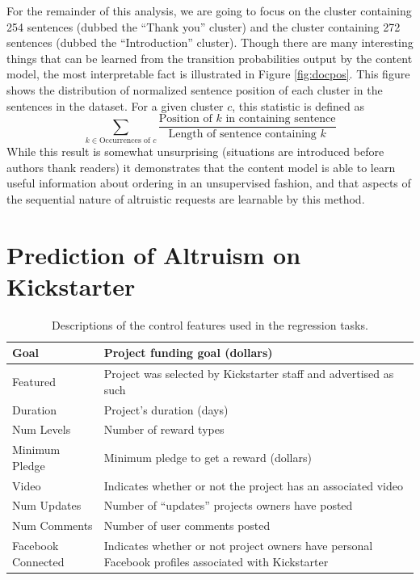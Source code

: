 \documentclass[letterpaper]{article}
\begin{document}
For the remainder of this analysis, we are going to focus on the cluster containing 254 sentences (dubbed the ``Thank you'' cluster) and the cluster containing 272 sentences (dubbed the ``Introduction'' cluster). Though there are many interesting things that can be learned from the transition probabilities output by the content model, the most interpretable fact is illustrated in Figure \ref{fig:docpos}. This figure shows the distribution of normalized sentence position of each cluster in the sentences in the dataset. For a given cluster $c$, this statistic is defined as
\begin{equation} \label{eq:sentpos}
\sum\limits_{k \in \text{Occurrences of $c$}} \frac{\text{Position of $k$ in containing sentence}}{\text{Length of sentence containing $k$}}
\end{equation}
While this result is somewhat unsurprising (situations are introduced before authors thank readers) it demonstrates that the content model is able to learn useful information about ordering in an unsupervised fashion, and that aspects of the sequential nature of altruistic requests are learnable by this method.

\section{Prediction of Altruism on Kickstarter}
\begin{table}
\centering
\begin{tabular}{|l|L{5cm}|}
\hline
Goal & Project funding goal (dollars) \\\hline
Featured & Project was selected by Kickstarter staff and advertised as such\\\hline
Duration & Project's duration (days) \\\hline
Num Levels & Number of reward types \\\hline
Minimum Pledge & Minimum pledge to get a reward (dollars)\\\hline
Video & Indicates whether or not the project has an associated video \\\hline
Num Updates & Number of ``updates'' projects owners have posted \\\hline
Num Comments & Number of user comments posted \\\hline
Facebook Connected & Indicates whether or not project owners have personal Facebook profiles associated with Kickstarter\\
\hline
\end{tabular}
\caption{Descriptions of the control features used in the regression tasks.}
\label{tab:controls}
\end{table}
\end{document}
